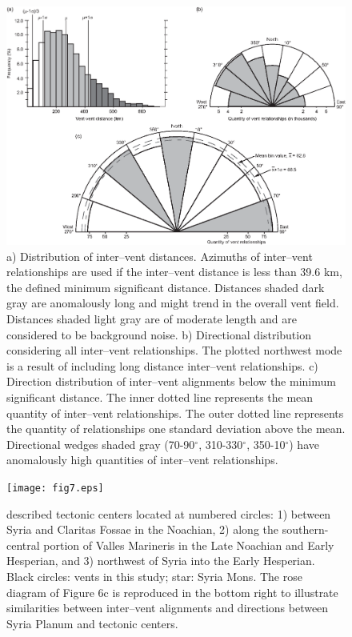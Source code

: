 \documentclass[preprint,review,authoryear,12pt]{elsarticle}
\begin{document}
\begin{figure}
\noindent\includegraphics{fig6.eps}
\caption{a) Distribution of inter--vent distances. Azimuths of inter--vent relationships are used if the inter--vent distance is less than 39.6 km, the defined minimum significant distance. Distances shaded dark gray are anomalously long and might trend in the overall vent field. Distances shaded light gray are of moderate length and are considered to be background noise. b) Directional distribution considering all inter--vent relationships. The plotted northwest mode is a result of including long distance inter--vent relationships. c) Direction distribution of inter--vent alignments below the minimum significant distance. The inner dotted line represents the mean quantity of inter--vent relationships. The outer dotted line represents the quantity of relationships one standard deviation above the mean. Directional wedges shaded gray (70-90$^{\circ}$, 310-330$^{\circ}$, 350-10$^{\circ}$) have anomalously high quantities of inter--vent relationships.}
\label{fig-azgraphs}
\end{figure}

\begin{figure}
\noindent\texttt{[image: fig7.eps]}
\caption{\citet{Anderson2001} described tectonic centers located at numbered circles: 1) between Syria and Claritas Fossae in the Noachian, 2) along the southern-central portion of Valles Marineris in the Late Noachian and Early Hesperian, and 3) northwest of Syria into the Early Hesperian. Black circles: vents in this study; star: Syria Mons. The rose diagram of Figure 6c is reproduced in the bottom right to illustrate similarities between inter--vent alignments and directions between Syria Planum and tectonic centers.}
\label{fig-andersoncenters}
\end{figure}
\end{document}
